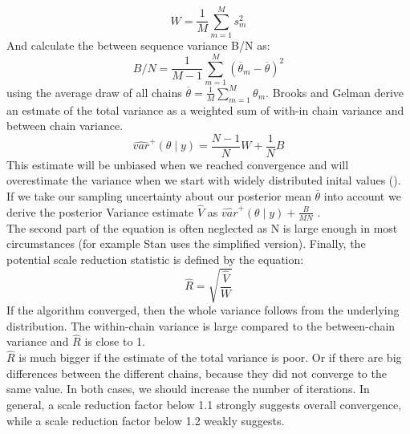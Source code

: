 $$W=\frac{1}{M} \sum_{m=1}^{M} s_m^2 $$ 
And calculate the between sequence variance B/N as:
$$B/N=\frac{1}{M-1} \sum_{m=1}^{M} (\overline{\theta}_m-\overline{\theta} )^2 $$
using the average draw of all chains $\overline{\theta}=\frac{1}{M} \sum_{m=1}^{M} \theta_m$.
Brooks and Gelman derive an estmate of the total variance as a weighted sum of with-in chain variance and between chain variance.
$$\widehat{var}^+ (\theta \mid y)=\frac{N-1}{N}W+\frac{1}{N}B$$
This estimate will be unbiased when we reached convergence and will overestimate the variance when we start with widely distributed inital values (\cite{brooks1998}).
If we take our sampling uncertainty about our posterior mean $\overline{\theta} $ into account we derive the posterior Variance estimate $\widehat{V}$ as $\widehat{var}^+ (\theta \mid y) +\frac{B}{MN}$ 
.\\
The second part of the equation is often neglected as N is large enough in most circumstances (for example Stan uses the simplified version).
Finally, the potential scale reduction statistic is defined by the equation:
$$\widehat{R}=\sqrt{\frac{\widehat{V}}{W}}$$
If the algorithm converged, then the whole variance follows from the underlying distribution. The within-chain variance is large compared to the between-chain variance and $ \widehat{R}$ is close to 1.\\
$\widehat{R}$ is much bigger if the estimate of the total variance is poor. Or if there are big differences between the different chains, because they did not converge to the same value.  In both cases, we should increase the number of iterations. In general, a scale reduction factor below 1.1 strongly suggests overall convergence, while a scale reduction factor below 1.2 weakly suggests.\cite{brooks1998}


